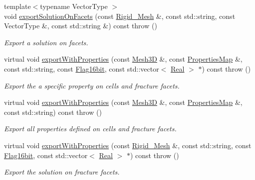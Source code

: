 \begin{DoxyCompactItemize}
{\footnotesize template$<$typename Vector\+Type $>$ }\\void \hyperlink{classFVCode3D_1_1ExporterCP_a3d6174f07fbbe3b7ea6ea3c563b33a54}{export\+Solution\+On\+Facets} (const \hyperlink{classFVCode3D_1_1Rigid__Mesh}{Rigid\+\_\+\+Mesh} \&, const std\+::string, const Vector\+Type \&, const std\+::string \&) const   throw ()
\begin{DoxyCompactList}\small\item\em Export a solution on facets. \end{DoxyCompactList}\item 
virtual void \hyperlink{classFVCode3D_1_1ExporterCP_a64cbb189ce2b45dcb38eb7fd956812fb}{export\+With\+Properties} (const \hyperlink{classFVCode3D_1_1Mesh3D}{Mesh3D} \&, const \hyperlink{classFVCode3D_1_1PropertiesMap}{Properties\+Map} \&, const std\+::string, const \hyperlink{namespaceFVCode3D_a17a9cb86e2e25bbfbfcb645a2eec1d64}{Flag16bit}, const std\+::vector$<$ \hyperlink{namespaceFVCode3D_a40c1f5588a248569d80aa5f867080e83}{Real} $>$ $\ast$) const   throw ()
\begin{DoxyCompactList}\small\item\em Export the a specific property on cells and fracture facets. \end{DoxyCompactList}\item 
virtual void \hyperlink{classFVCode3D_1_1ExporterCP_a330bbf7e7782587ef5b209b5f827d3e2}{export\+With\+Properties} (const \hyperlink{classFVCode3D_1_1Mesh3D}{Mesh3D} \&, const \hyperlink{classFVCode3D_1_1PropertiesMap}{Properties\+Map} \&, const std\+::string) const   throw ()
\begin{DoxyCompactList}\small\item\em Export all properties defined on cells and fracture facets. \end{DoxyCompactList}\item 
virtual void \hyperlink{classFVCode3D_1_1ExporterCP_a566ca65937e3cad48335bf07b2264239}{export\+With\+Properties} (const \hyperlink{classFVCode3D_1_1Rigid__Mesh}{Rigid\+\_\+\+Mesh} \&, const std\+::string, const \hyperlink{namespaceFVCode3D_a17a9cb86e2e25bbfbfcb645a2eec1d64}{Flag16bit}, const std\+::vector$<$ \hyperlink{namespaceFVCode3D_a40c1f5588a248569d80aa5f867080e83}{Real} $>$ $\ast$) const   throw ()
\begin{DoxyCompactList}\small\item\em Export the solution on fracture facets. \end{DoxyCompactList}\end{DoxyCompactItemize}
